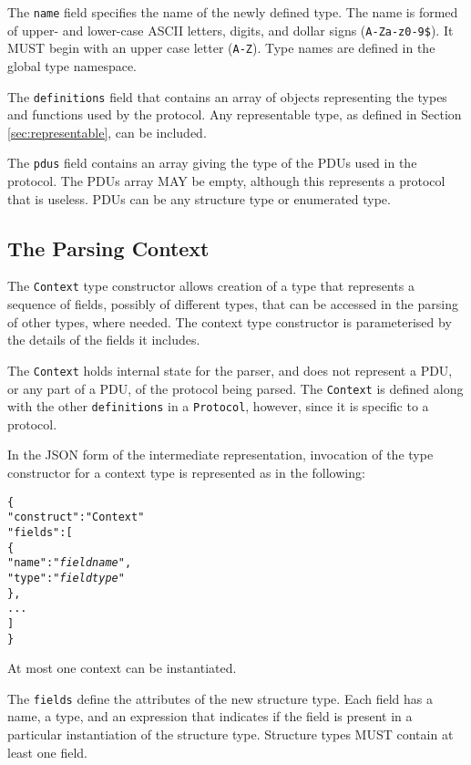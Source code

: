 \documentclass[10pt,twocolumn,a4paper]{article}
\newcommand{\code}[1]{\texttt{#1}}
\begin{document}
The \code{name} field specifies the name of the newly defined type. The
name is formed of upper- and lower-case ASCII letters, digits, and dollar
signs (\code{A-Za-z0-9\$}).  It MUST begin with an upper case letter
(\code{A-Z}). Type names are defined in the global type namespace.

The \code{definitions} field that contains an array of objects representing
the types and functions used by the protocol. Any representable type, as
defined in Section \ref{sec:representable}, can be included.

The \code{pdus} field contains an array giving the type of the PDUs used
in the protocol. The PDUs array MAY be empty, although this represents a
protocol that is useless. PDUs can be any structure type or enumerated
type. 

\subsection{The Parsing Context}
\label{sec:context}

The \code{Context} type constructor allows creation of a type that
represents a sequence of fields, possibly of different types, that can be
accessed in the parsing of other types, where needed. The context type
constructor is parameterised by the details of the fields it includes.

The \code{Context} holds internal state for the parser, and does not
represent a PDU, or any part of a PDU, of the protocol being parsed.
The \code{Context} is defined along with the other \code{definitions}
in a \code{Protocol}, however, since it is specific to a protocol.

In the JSON form of the intermediate representation, invocation of the type
constructor for a context type is represented as in the following:
\footnotesize
\begin{alltt}
  \{
    "construct"   : "Context"
    "fields"      : [
      \{
        "name"    : "\emph{field name}",
        "type"    : "\emph{field type}"
      \},
      ...
    ]
  \}
\end{alltt}
\normalsize
At most one context can be instantiated.

The \code{fields} define the attributes of the new structure type. Each
field has a name, a type, and an expression that indicates if the field is
present in a particular instantiation of the structure type. Structure
types MUST contain at least one field.
\end{document}
